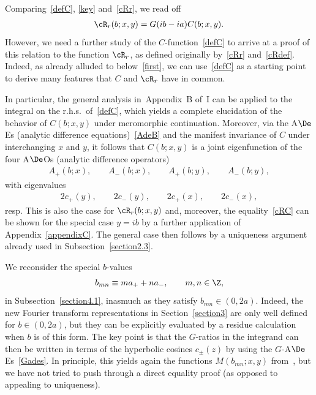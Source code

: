 Comparing~\eqref{defC}, \eqref{key} and~\eqref{cRr}, we read of\/f
\begin{gather}\label{cRC}
\cR_r(b;x,y)=G(ib-ia)C(b;x,y).
\end{gather}
However, we need a further study of the $C$-function~\eqref{defC} to arrive at a proof of this relation to the function $\cR_r$, as def\/ined originally by~\eqref{cRr} and~\eqref{cRdef}. Indeed, as already alluded to below~\eqref{first}, we can use~\eqref{defC} as a starting point to derive many features that $C$ and $\cR_r$ have in common.

In particular, the general analysis in~Appendix~B of~I can be applied to the integral on the r.h.s.\ of~\eqref{defC}, which yields a complete elucidation of the behavior of $C(b;x,y)$ under meromorphic continuation.
Moreover, via the A$\De$Es (analytic dif\/ference equations)~\eqref{AdeB} and the manifest invariance of $C$ under interchanging $x$ and $y$, it follows that
$C(b;x,y)$ is a joint eigenfunction of the four A$\De$Os (analytic dif\/ference operators)
\begin{gather}\label{4A}
A_{+}(b;x),\qquad A_{-}(b;x),\qquad A_{+}(b;y),\qquad
A_{-}(b;y),
\end{gather}
with eigenvalues
\begin{gather}\label{4ev}
2c_{+}(y),\qquad 2c_{-}(y),\qquad
2c_{+}(x),\qquad 2c_{-}(x),
\end{gather}
resp. This is also the case for $\cR_r(b;x,y)$ and, moreover, the equality~\eqref{cRC} can be shown for the special case $y=ib$ by a further application of Appendix~\ref{appendixC}. The general case then follows by a uniqueness argument already used in Subsection~\ref{section2.3}.

We reconsider the special $b$-values
\begin{gather}\label{bmn}
b_{mn}\equiv ma_{+}+na_{-},\qquad m,n\in\Z,
\end{gather}
in Subsection~\ref{section4.1}, inasmuch as they satisfy $b_{mn}\in(0,2a)$.  Indeed, the new Fourier transform representations in Section~\ref{section3} are only well def\/ined for $b\in(0,2a)$, but they can be explicitly evaluated by a residue calculation when $b$ is of this form. The key point is that the $G$-ratios in the integrand can then be written in terms of the hyperbolic cosines $c_{\pm}(z)$ by using the $G$-A$\De$Es~\eqref{Gades}. In principle, this yields again the functions $M(b_{mn};x,y)$ from~\cite{GLFII}, but we have not tried to push through a direct equality proof (as opposed to appealing to uniqueness).
